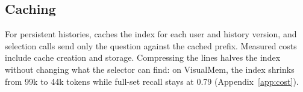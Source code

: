 \subsection{Caching}
\label{sec:cache}

For persistent histories, \vgs{} caches the index for each user and history version, and selection calls send only the question against the cached prefix. Measured costs include cache creation and storage. Compressing the lines halves the index without changing what the selector can find: on VisualMem, the index shrinks from 99k to 44k tokens while full-set recall stays at 0.79 (Appendix~\ref{app:cost}).
